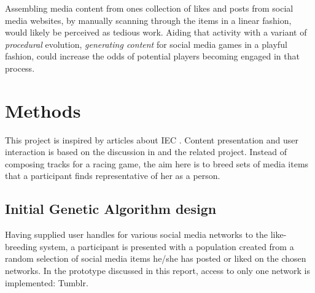 \documentclass[conference]{IEEETran}
\begin{document}
Assembling media content from ones collection of likes and posts from social media websites, by manually scanning through the items in a linear fashion, would likely be perceived as tedious work.  Aiding that activity with a variant of \textit{procedural} evolution, \textit{generating content} for social media games in a playful fashion, could increase the odds of potential players becoming engaged in that process.



\section{Methods}
\label{sec:Methods}

This project is inspired by articles about IEC \cite{cardamone2011interactive,secretan2011picbreeder,togelius2007towards}.  Content presentation and user interaction is based on the discussion in \cite{cardamone2011interactive} and the related project.  Instead of composing tracks for a racing game, the aim here is to breed sets of media items that a participant finds representative of her as a person.


\subsection{Initial Genetic Algorithm design}
\label{sec:InitialAlgorithm}

Having supplied user handles for various social media networks to the like-breeding system, a participant is presented with a population created from a random selection of social media items he/she has posted or liked on the chosen networks.  In the prototype discussed in this report, access to only one network is implemented:  Tumblr.
\end{document}
